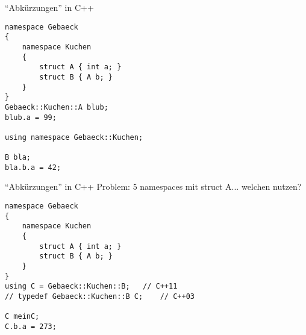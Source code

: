 

\begin{frame}[fragile]{\enquote{Abkürzungen} in C++}
	
	\begin{lstlisting}[]
namespace Gebaeck
{
    namespace Kuchen
    {
        struct A { int a; }
        struct B { A b; }
    }
}
Gebaeck::Kuchen::A blub;
blub.a = 99;

using namespace Gebaeck::Kuchen;

B bla;
bla.b.a = 42;
	\end{lstlisting}
\end{frame}

\begin{frame}[fragile]{\enquote{Abkürzungen} in C++}
	Problem: 5 namespaces mit struct A... welchen nutzen?

	\begin{lstlisting}[]
namespace Gebaeck
{
    namespace Kuchen
    {
        struct A { int a; }
        struct B { A b; }
    }
}
using C = Gebaeck::Kuchen::B;	// C++11
// typedef Gebaeck::Kuchen::B C;	// C++03

C meinC;
C.b.a = 273;
	\end{lstlisting}
\end{frame}


